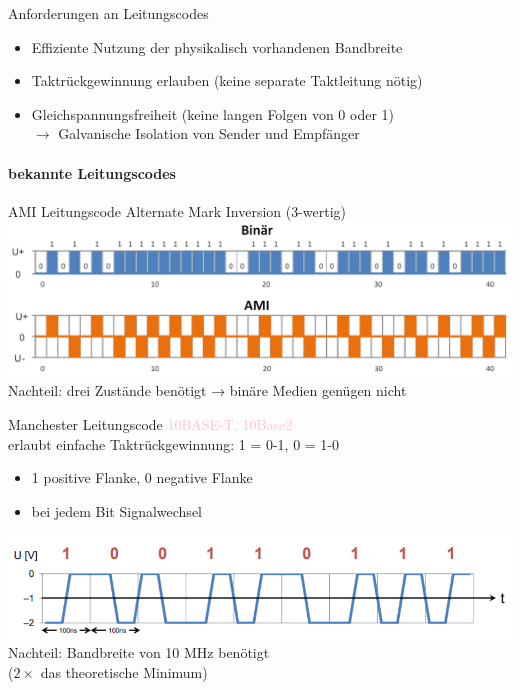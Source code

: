 \begin{KR}{Anforderungen an Leitungscodes}
\begin{itemize}
    \item Effiziente Nutzung der physikalisch vorhandenen Bandbreite
    \item Taktrückgewinnung erlauben (keine separate Taktleitung nötig)
    \item Gleichspannungsfreiheit (keine langen Folgen von 0 oder 1) \\ $\rightarrow$ Galvanische Isolation von Sender und Empfänger
\end{itemize} 
\end{KR}

\paragraph{bekannte Leitungscodes}

\begin{concept}{AMI Leitungscode} Alternate Mark Inversion (3-wertig)\\
    \includegraphics[width=0.7\linewidth]{images/gleichspannungsfreiheit.png}\\
    Nachteil: drei Zustände benötigt → binäre Medien genügen nicht
\end{concept}

\begin{concept}{Manchester Leitungscode} \textcolor{pink}{10BASE-T, 10Base2}\\
    erlaubt einfache Taktrückgewinnung: 1 = 0-1, 0 = 1-0
    \begin{itemize}
        \item 1 positive Flanke, 0 negative Flanke
        \item bei jedem Bit Signalwechsel
    \end{itemize}
    \includegraphics[width=0.6\linewidth]{images/leitungscode.png}\\
    Nachteil: Bandbreite von 10 MHz benötigt \\ ($2 \times$ das theoretische Minimum)
\end{concept}

